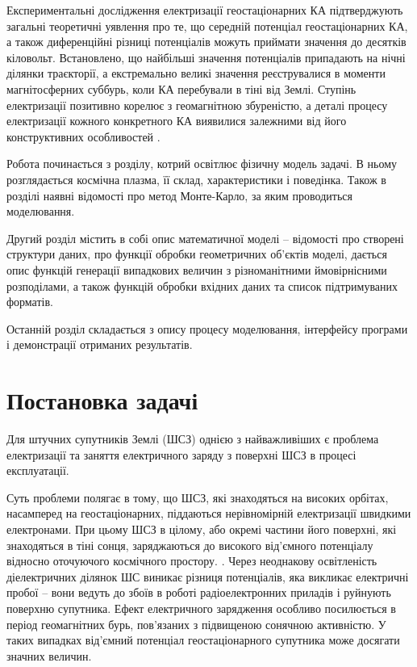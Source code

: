 \documentclass[a4paper,12pt]{article}
\begin{document}
Експериментальні дослідження електризації геостаціонарних КА підтверджують загальні теоретичні уявлення про те, що середній потенціал геостаціонарних КА, а також диференційні різниці потенціалів можуть приймати значення до десятків кіловольт. Встановлено, що найбільші значення потенціалів припадають на нічні ділянки траєкторії, а екстремально великі значення реєструвалися в моменти магнітосферних суббурь, коли КА перебували в тіні від Землі. Ступінь електризації позитивно корелює з геомагнітною збуреністю, а деталі процесу електризації кожного конкретного КА виявилися залежними від його конструктивних особливостей \cite{vakulin}.

Робота починається з розділу, котрий освітлює фізичну модель задачі. В ньому розглядається космічна плазма, її склад, характеристики і поведінка. Також в розділі наявні відомості про метод Монте-Карло, за яким проводиться моделювання.

Другий розділ містить в собі опис математичної моделі -- відомості про створені структури даних, про функції обробки геометричних об’єктів моделі, дається опис функцій генерації випадкових величин з різноманітними ймовірнісними розподілами, а також функцій обробки вхідних даних та список підтримуваних форматів.

Останній розділ складається з опису процесу моделювання, інтерфейсу програми і демонстрації отриманих результатів.

\newpage


\section*{Постановка задачі}
Для штучних супутників Землі (ШСЗ) однією з найважливіших є проблема електризації та заняття електричного заряду з поверхні ШСЗ в процесі експлуатації.

Суть проблеми полягає в тому, що ШСЗ, які знаходяться на високих орбітах, насамперед на геостаціонарних, піддаються  нерівномірній електризації швидкими електронами. При цьому ШСЗ в цілому, або окремі частини його поверхні, які знаходяться в тіні сонця, заряджаються до високого від’ємного потенціалу відносно оточуючого космічного простору. \cite{report1}. Через неоднакову освітленість діелектричних ділянок ШС виникає різниця потенціалів, яка викликає електричні пробої -- вони ведуть до збоїв в роботі радіоелектронних приладів і руйнують поверхню супутника. Ефект електричного зарядження особливо посилюється в період геомагнітних бурь, пов’язаних з підвищеною сонячною активністю. У таких випадках від’ємний потенціал геостаціонарного супутника може досягати значних величин. \cite{sharp} \cite{deforest}
\end{document}
